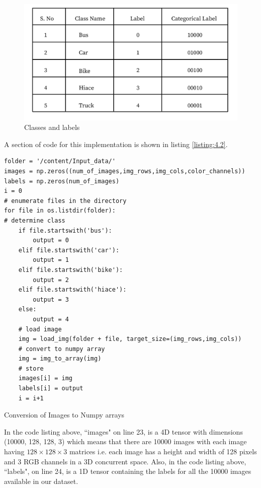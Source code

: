 \begin{figure}[H]
    \centering
    \captionsetup{justification = centering}
    \includegraphics[scale = 0.2]{CHAPTERS/Chapter-4/Images/class_label-01}
    \caption{Classes and labels} 
    \label{fig:class_labels}
  \end{figure}

\noindent A section of code for this implementation is shown in listing \ref{listing:4.2}.

\begin{longlisting}
    \begin{verbatim}
folder = '/content/Input_data/'
images = np.zeros((num_of_images,img_rows,img_cols,color_channels))
labels = np.zeros(num_of_images)
i = 0
# enumerate files in the directory
for file in os.listdir(folder):
# determine class
    if file.startswith('bus'):
        output = 0
    elif file.startswith('car'):
        output = 1
    elif file.startswith('bike'):
        output = 2
    elif file.startswith('hiace'):
        output = 3
    else:
        output = 4
    # load image
    img = load_img(folder + file, target_size=(img_rows,img_cols))
    # convert to numpy array
    img = img_to_array(img)
    # store
    images[i] = img
    labels[i] = output
    i = i+1
\end{verbatim}

\caption{Conversion of Images to Numpy arrays}
\label{listing:4.2}
\end{longlisting}
In the code listing above, ``images" on line 23, is a 4D tensor with
dimensions (10000, 128, 128, 3) which means that there are 10000
images with each image having $128\times 128\times 3$ matrices i.e.
each image has a height and width of 128 pixels and 3 RGB channels in a
3D concurrent space. Also, in the code listing above,
``labels", on line 24, is a 1D tensor containing the labels
for all the 10000 images available in our dataset.

